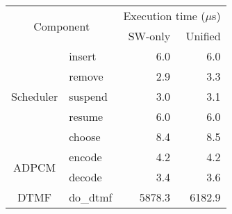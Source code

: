 \begin{tabular}{clrr}
\toprule
\multicolumn{2}{c}{\multirow{2}{*}{Component}}             & \multicolumn{2}{c}{Execution time ($\mu$s)} \\
\cmidrule(l){3-4}
                              &           & SW-only & Unified \\

\midrule
\multirow{5}{*}{Scheduler}    & insert    & ~~~6.0  & ~~~6.0 \\
                              & remove    & ~~~2.9  & ~~~3.3 \\
                              & suspend   & ~~~3.0  & ~~~3.1 \\
                              & resume    & ~~~6.0  & ~~~6.0 \\
                              & choose    & ~~~8.4  & ~~~8.5 \\
\midrule
\multirow{2}{*}{ADPCM}        & encode    & ~~~4.2  & ~~~4.2 \\                            
                              & decode    & ~~~3.4  & ~~~3.6 \\                            
\midrule
DTMF                          & do\_dtmf  & 5878.3  & 6182.9 \\
\bottomrule
\end{tabular}


